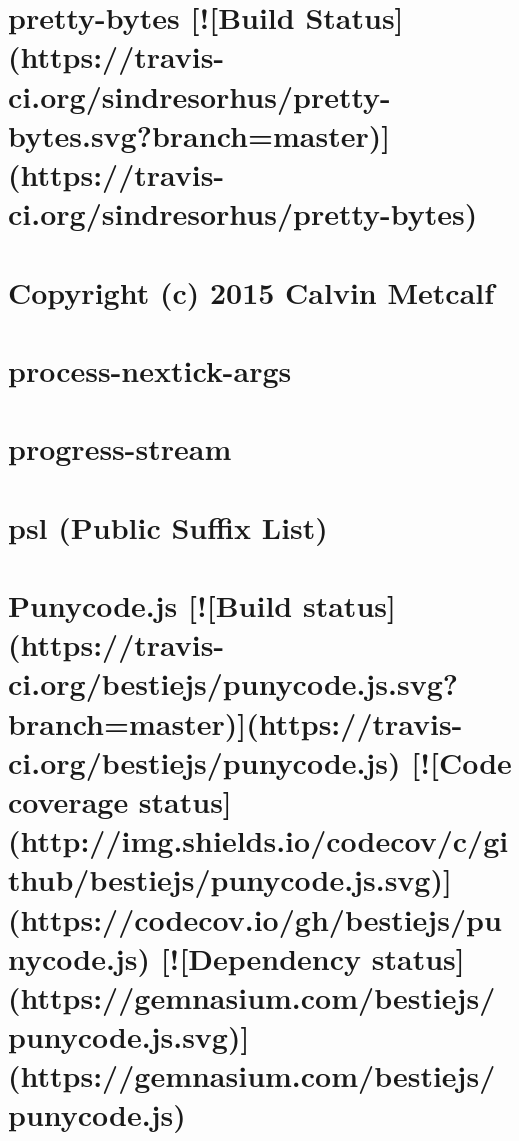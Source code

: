 \documentclass[twoside]{book}
\newcommand{\+}{\discretionary{\mbox{\scriptsize$\hookleftarrow$}}{}{}}
\begin{document}
\chapter{pretty-\/bytes \mbox{[}!\mbox{[}Build Status\mbox{]}(https\+://travis-\/ci.org/sindresorhus/pretty-\/bytes.svg?branch=master)\mbox{]}(https\+://travis-\/ci.org/sindresorhus/pretty-\/bytes)}
\label{md_dsmacc_vis_degree_node_modules_pretty-bytes_readme}

\chapter{Copyright (c) 2015 Calvin Metcalf}
\label{md_dsmacc_vis_degree_node_modules_process-nextick-args_license}

\chapter{process-\/nextick-\/args}
\label{md_dsmacc_vis_degree_node_modules_process-nextick-args_readme}

\chapter{progress-\/stream}
\label{md_dsmacc_vis_degree_node_modules_progress-stream_README}

\chapter{psl (Public Suffix List)}
\label{md_dsmacc_vis_degree_node_modules_psl_README}

\chapter{Punycode.\+js \mbox{[}!\mbox{[}Build status\mbox{]}(https\+://travis-\/ci.org/bestiejs/punycode.js.\+svg?branch=master)\mbox{]}(https\+://travis-\/ci.org/bestiejs/punycode.js) \mbox{[}!\mbox{[}Code coverage status\mbox{]}(http\+://img.shields.\+io/codecov/c/github/bestiejs/punycode.js.\+svg)\mbox{]}(https\+://codecov.io/gh/bestiejs/punycode.js) \mbox{[}!\mbox{[}Dependency status\mbox{]}(https\+://gemnasium.com/bestiejs/punycode.js.\+svg)\mbox{]}(https\+://gemnasium.com/bestiejs/punycode.js)}
\label{md_dsmacc_vis_degree_node_modules_punycode_README}

\end{document}

